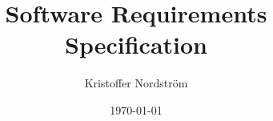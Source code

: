 \documentclass{report}
\begin{document}
\thispagestyle{empty}

\title{Software Requirements Specification}
\author{Kristoffer Nordström}
\date{\today}
\maketitle
\newpage

\tableofcontents
\newpage



\appendix

\end{document}
